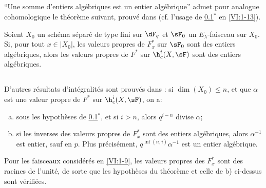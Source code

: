 \subsection{}\label{VI:2-1}

``Une somme d'entiers algébriques est un entier algébrique'' admet pour 
analogue cohomologique le théorème suivant, prouvé dans 
\cite[XXI 5.2.2]{sga7} (cf. l'usage de \ref{VI:2-1}$^\ast$ en 
\ref{VI:1-13}). 





\begin{theorem*}[2.1*]\label{VI:2-1*}
Soient $X_0$ un schéma séparé de type fini sur $\dF_q$ et $\sF_0$ un 
$E_\lambda$-faisceau sur $X_0$. Si, pour tout $x\in |X_0|$, les valeurs 
propres de $F_x^\ast$ sur $\sF_0$ sont des entiers algébriques, alors les 
valeurs propres de $F^\ast$ sur $\h_c^i(X,\sF)$ sont des entiers algébriques. 
\end{theorem*}





\subsection{}\label{VI:2-2}

D'autres résultats d'intégralités sont prouvés dans 
\cite[XXI, 5.2.2 et 5.4]{sga7}: si $\dim(X_0)\leqslant n$, et que $\alpha$ est 
une valeur propre de $F^\ast$ sur $\h_c^i(X,\sF)$, on a: 
\begin{enumerate}[a)]
  \item sous les hypothèses de \ref{VI:2-1}$^\ast$, et si $i>n$, alors 
    $q^{i-n}$ divise $\alpha$;
  \item si les inverses des valeurs propres de $F_x^\ast$ sont des entiers 
    algébriques, alors $\alpha^{-1}$ est entier, sauf en $p$. Plus 
    précisément, $q^{\inf(n,i)}\alpha^{-1}$ est un entier algébrique. 
\end{enumerate}

Pour les faisceaux considérés en \ref{VI:1-9}, les valeurs propres des 
$F_x^\ast$ sont des racines de l'unité, de sorte que les hypothèses du 
théorème et celle de b) ci-dessus sont vérifiées. 





\subsection{}\label{VI:2-3}

